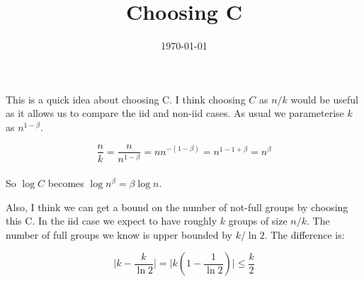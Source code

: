 \documentclass[11pt]{article}
\begin{document}
\title{Choosing C}

\date{\today}

\maketitle

This is a quick idea about choosing C. I think choosing \(C\) as \(n/k\) would be useful as it allows us to compare the iid and non-iid cases. As usual we parameterise \(k\) as \(n^{1-\beta}\).

\begin{equation}
\frac{n}{k} = \frac{n}{n^{1-\beta}} = nn^{-(1-\beta)} = n^{1-1+\beta} = n^\beta
\end{equation}
\\
So \(\log{C}\) becomes \(\log{n^\beta} = \beta\log{n}\).

Also, I think we can get a bound on the number of not-full groups by choosing this C. In the iid case we expect to have roughly \(k\) groups of size \(n/k\). The number of full groups we know is upper bounded by \(k/\ln{2}\). The difference is:

\begin{equation}
\mid k-\frac{k}{\ln{2}}\mid = \mid k\left(1-\frac{1}{\ln{2}}\right)\mid \leq \frac{k}{2}
\end{equation}
\end{document}
